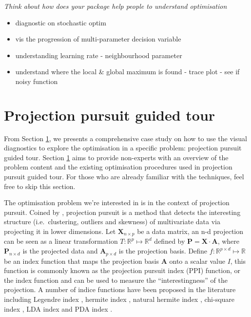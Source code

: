 \documentclass[12pt]{article}
\providecommand{\tightlist}{%
  \setlength{\itemsep}{0pt}\setlength{\parskip}{0pt}}
\begin{document}
\emph{Think about how does your package help people to understand
optimisation}

\begin{itemize}
\tightlist
\item
  diagnostic on stochastic optim
\item
  vis the progression of multi-parameter decision variable
\item
  understanding learning rate - neighbourhood parameter
\item
  understand where the local \& global maximum is found - trace plot -
  see if noisy function
\end{itemize}

\hypertarget{tour}{%
\section{Projection pursuit guided tour}\label{tour}}

From Section \ref{tour}, we presents a comprehensive case study on how
to use the visual diagnostics to explore the optimisation in a specific
problem: projection pursuit guided tour. Section \ref{tour} aims to
provide non-experts with an overview of the problem content and the
existing optimisation procedures used in projection pursuit guided tour.
For those who are already familiar with the techniques, feel free to
skip this section.

The optimisation problem we're interested in is in the context of
projection pursuit. Coined by \citet{friedman1974projection}, projection
pursuit is a method that detects the interesting structure
(i.e.~clustering, outliers and skewness) of multivariate data via
projecting it in lower dimensions. Let \(\mathbf{X}_{n \times p}\) be a
data matrix, an n-d projection can be seen as a linear transformation
\(T: \mathbb{R}^p \mapsto \mathbb{R}^d\) defined by
\(\mathbf{P} = \mathbf{X} \cdot \mathbf{A}\), where
\(\mathbf{P}_{n \times d}\) is the projected data and
\(\mathbf{A}_{p\times d}\) is the projection basis. Define
\(f: \mathbb{R}^{p \times d} \mapsto \mathbb{R}\) be an index function
that maps the projection basis \(\mathbf{A}\) onto a scalar value \(I\),
this function is commonly known as the projection pursuit index (PPI)
function, or the index function and can be used to measure the
``interestingness'' of the projection. A number of indice functions have
been proposed in the literature including Legendre index
\citep{friedman1974projection}, hermite index
\citep{hall1989polynomial}, natural hermite index
\citep{cook1993projection}, chi-square index
\citep{posse1995projection}, LDA index \citep{lee2005projection} and PDA
index \citep{lee2010projection}.
\end{document}
